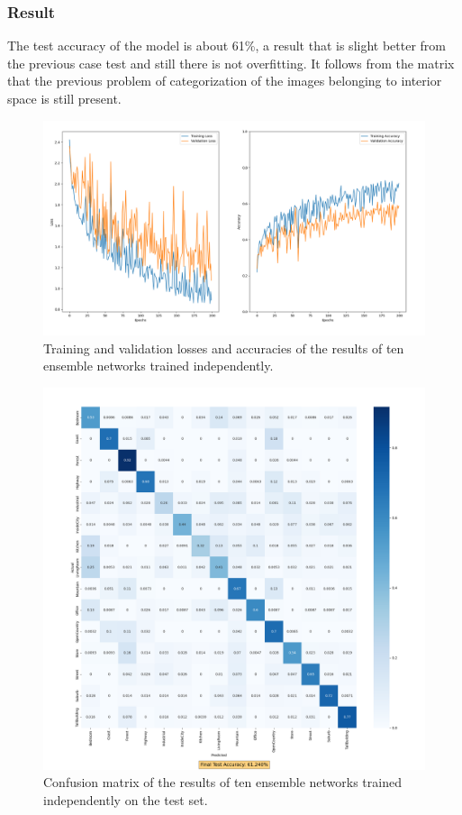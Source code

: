 \documentclass[12pt, a4paper, italian]{scrartcl}
\begin{document}
    \subsubsection{Result}
    The test accuracy of the model is about 61\%, a result that is slight better from the previous case test and still there is not overfitting.
It follows from the matrix that the previous problem of categorization of the images belonging to interior space is still present.
     \begin{figure} [h!]
 \centering
  { \includegraphics[width=.70\textwidth]{fig/loss_and_accuracy_task_2_ensemble_of_networks.png} \caption{Training and validation losses and accuracies of the results of ten ensemble networks trained independently.
}} 
  \end{figure}
 
  \begin{figure} [h!!!]
 \centering
  { \includegraphics[width=.65\textwidth]{fig/confusion_matrix_task_2_ensemble_of_networks.png} \caption{Confusion matrix of the results of ten ensemble networks trained independently on the test set.
}} 
  \end{figure}
  
  \newpage
  
\end{document}
